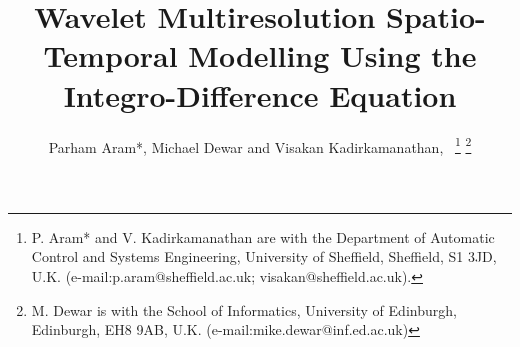 \documentclass[11pt,draftcls,onecolumn,peerreview]{IEEEtran}
\begin{document}
%
\title{Wavelet Multiresolution Spatio-Temporal Modelling Using the Integro-Difference Equation }
%
%
%

\author{Parham Aram*,
        Michael Dewar and Visakan Kadirkamanathan,~  %
\thanks{P. Aram* and V. Kadirkamanathan are with the Department of Automatic Control and Systems Engineering, University of Sheffield, Sheffield, S1 3JD, U.K. (e-mail:p.aram@sheffield.ac.uk; visakan@sheffield.ac.uk).}%
\thanks{M. Dewar is with the School of Informatics, University of Edinburgh, Edinburgh, EH8 9AB, U.K. (e-mail:mike.dewar@inf.ed.ac.uk)}}%

% 
%



% 
 \ifCLASSOPTIONpeerreview
\else
\fi
\end{document}
